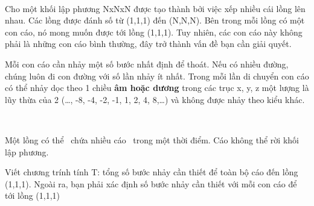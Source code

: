  

Cho một khối lập phương NxNxN được tạo thành bởi việc xếp nhiều cái lồng lên nhau. Các lồng được đánh số từ (1,1,1) đến (N,N,N). Bên trong mỗi lồng có một con cáo, nó mong muốn được tới lồng (1,1,1). Tuy nhiên, các con cáo này không phải là những con cáo bình thường, đây trở thành vấn đề bạn cần giải quyết.

Mỗi con cáo cần nhảy một số bước nhất định để thoát. Nếu có nhiều đường, chúng luôn đi con đường với số lần nhảy ít nhất. Trong mỗi lần di chuyển con cáo có thể nhảy dọc theo 1 chiều \textbf{ âm hoặc dương } trong các trục x, y, z một lượng là lũy thừa của 2 (…, -8, -4, -2, -1, 1, 2, 4, 8,…) và không được nhảy theo kiểu khác.

 

Một lồng có thể  chứa nhiều cáo  trong một thời điểm. Cáo không thể rời khối lập phương.

Viết chương trính tính T: tổng số bước nhảy cần thiết để toàn bộ cáo đến lồng (1,1,1). Ngoài ra, bạn phải xác định số bước nhảy cần thiết với mỗi con cáo để tới lồng (1,1,1)